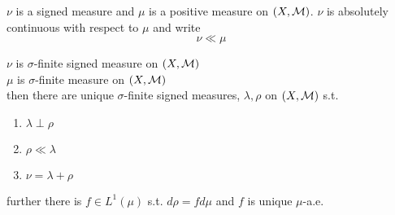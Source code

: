 \begin{dfn}
	$\nu$ is a signed measure and $\mu$ is a positive measure on $(X, {\mathcal M})$. $\nu$ is absolutely continuous with respect to $\mu$ and write \[
	\nu \ll \mu
	\]

\end{dfn}

\begin{thm}
	$\nu$ is $\sigma$-finite signed measure on $(X, {\mathcal M})$\\
	$\mu$ is $\sigma$-finite measure on $(X, {\mathcal M})$\\
	then there are unique $\sigma$-finite signed measures, $\lambda, \rho$ on $(X, {\mathcal M})$ s.t. 
	\begin{enumerate}
	\item $\lambda \perp \rho$
	\item $\rho \ll \lambda$
	\item 	$\nu = \lambda + \rho$
	\end{enumerate}
further there is $f \in L^1( \mu)$ s.t. $d \rho = f d \mu$ and $f$ is unique $\mu$-a.e.
\end{thm}

